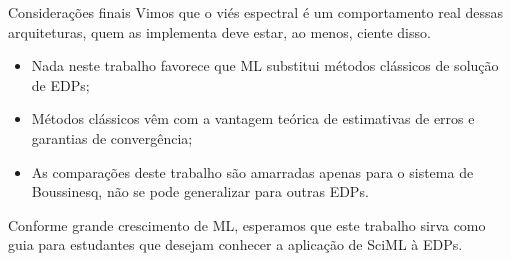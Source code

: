 \begin{frame}{Considerações finais}
  Vimos que o viés espectral é um comportamento real dessas arquiteturas, quem as implementa deve estar, ao menos, ciente disso.
  \begin{itemize}[<+->]
    \item Nada neste trabalho favorece que ML substitui métodos clássicos de solução de EDPs;
    \item Métodos clássicos vêm com a vantagem teórica de estimativas de erros e garantias de convergência;
    \item As comparações deste trabalho são amarradas apenas para o sistema de Boussinesq, não se pode generalizar para outras EDPs.
  \end{itemize}
  \begin{information}[Fechamento]
    Conforme grande crescimento de ML, esperamos que este trabalho sirva como guia para estudantes que desejam conhecer a aplicação de SciML à EDPs.
  \end{information}
\end{frame}
